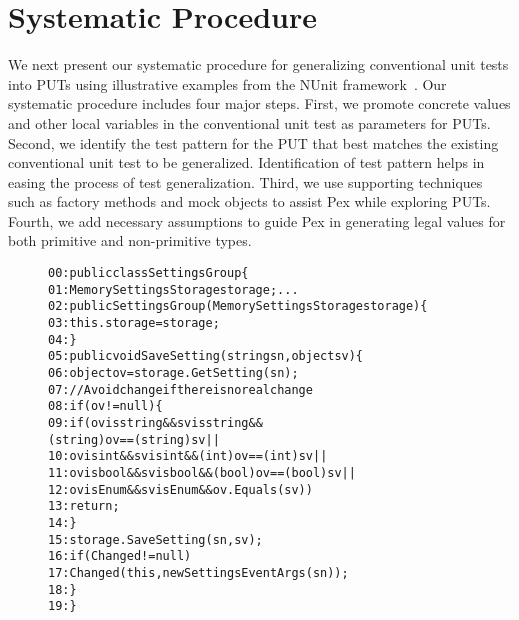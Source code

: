 \section{Systematic Procedure}
\label{sec:procedure}
We next present our systematic procedure for generalizing conventional unit tests into PUTs using illustrative examples from the NUnit framework~\cite{nunit}. Our systematic procedure includes four major steps. First, we promote concrete values and other local variables in the conventional unit test as parameters for PUTs. Second, we identify the test pattern for the PUT that best matches the existing conventional unit test to be generalized. Identification of test pattern helps in easing the process of test generalization. Third, we use supporting techniques such as factory methods and mock objects to assist Pex while exploring PUTs. Fourth, we add necessary assumptions to guide Pex in generating legal values for both primitive and non-primitive types. 

\begin{figure}[t]
\begin{CodeOut}
\begin{alltt}
00:public class SettingsGroup \{
01:\hspace*{0.1in}MemorySettingsStorage storage; ...
02:\hspace*{0.1in}public SettingsGroup(MemorySettingsStorage storage) \{
03:\hspace*{0.2in}this.storage = storage;
04:\hspace*{0.1in}\}
05:\hspace*{0.1in}public void SaveSetting(string sn, object sv) \{
06:\hspace*{0.2in}object ov = storage.GetSetting( sn );
07:\hspace*{0.2in}//Avoid change if there is no real change
08:\hspace*{0.2in}if (ov != null ) \{
09:\hspace*{0.3in}if (ov is string && sv is string && 
\hspace*{1.0in}(string)ov == (string)sv ||
10:\hspace*{0.4in}ov is int && sv is int && (int)ov == (int)sv ||
11:\hspace*{0.4in}ov is bool && sv is bool && (bool)ov == (bool)sv ||
12:\hspace*{0.4in}ov is Enum && sv is Enum && ov.Equals(sv))
13:\hspace*{0.5in}return;
14:\hspace*{0.2in}\}
15:\hspace*{0.2in}storage.SaveSetting(sn, sv);
16:\hspace*{0.2in}if (Changed != null)
17:\hspace*{0.3in}Changed(this, new SettingsEventArgs(sn));
18:\hspace*{0.2in}\}
19:\}
\end{alltt}
\end{CodeOut}
\end{figure}

